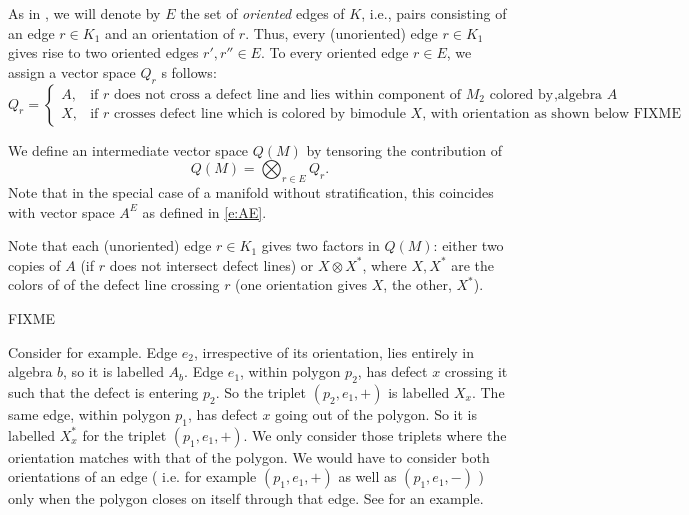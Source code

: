 \begin{defectfiguresetup}
As in , we will denote by $E$ the set of \emph{oriented}
edges of $K$, i.e., pairs consisting of an edge $r\in K_1$ and an orientation
of $r$. Thus, every (unoriented) edge $r\in K_1$ gives rise to two oriented
edges $r', r''\in E$. To every oriented edge $r\in E$, we assign a vector space
$Q_r$ s follows:
\begin{equation}\label{e:q-definition}
	Q_{r} =
	\begin{cases}
		A, & \text{if $r$ does not cross a defect line and lies within component of
		$M_2$ colored by algebra $A$ },\\
		X, & \text{if $r$ crosses defect line which is colored by bimodule $X$,
    with orientation as shown below FIXME}
	\end{cases}
	\end{equation}

We define an intermediate vector space $Q(M)$ by tensoring the contribution of
\begin{equation}\label{e:Qr}
	Q(M) = \bigotimes_{r\in E} Q_r.
\end{equation}
Note that in the special case of a manifold without stratification, this
coincides with vector space $A^E$ as defined in \eqref{e:AE}.

Note that each (unoriented) edge $r\in K_1$ gives two factors in $Q(M)$: either
two copies of $A$ (if $r$ does not intersect defect lines) or $X\otimes X^*$,
where $X, X^*$ are the colors of of the defect line crossing $r$ (one
orientation gives $X$, the other, $X^*$).


FIXME

Consider   for example. Edge $e_2$, irrespective of
its orientation, lies entirely in algebra $b$, so it is labelled $A_b$. Edge
$e_1$, within polygon $p_2$, has defect $x$ crossing it such that the defect is
entering $p_2$.  So the triplet $(p_2,e_1,+)$ is labelled $X_x$. The same edge,
within polygon $p_1$, has defect $x$ going out of the polygon. So it is
labelled $X_x^*$ for the triplet $(p_1,e_1,+)$.  We only consider those
triplets where the orientation matches with that of the polygon. We would have
to consider both orientations of an edge ( i.e. for example $(p_1,e_1,+)$ as
well as $(p_1,e_1,-)$ ) only when the polygon closes on itself through that
edge. See \cite[Section 3.5]{dkr} for an example.


\end{defectfiguresetup}
